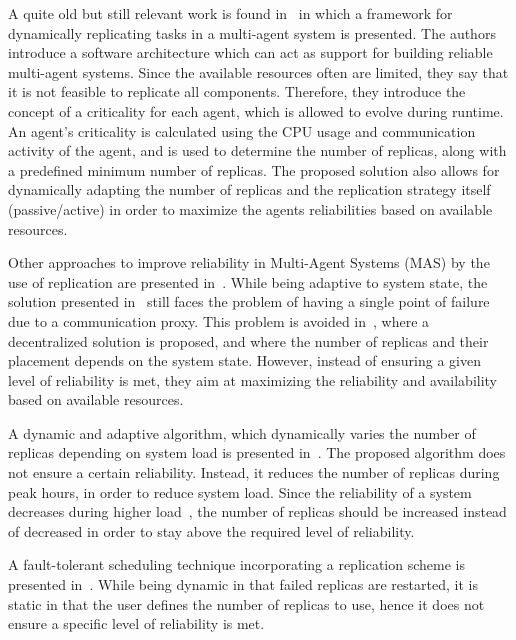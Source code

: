 \documentclass{cslthse-msc}
\begin{document}
A quite old but still relevant work is found in~\cite{dynAdaptRepl} in which a framework for dynamically replicating tasks in a multi-agent system is presented. The authors introduce a software architecture which can act as support for building reliable multi-agent systems. Since the available resources often are limited, they say that it is not feasible to replicate all components. Therefore, they introduce the concept of a criticality for each agent, which is allowed to evolve during runtime. An agent's criticality is calculated using the CPU usage and communication activity of the agent, and is used to determine the number of replicas, along with a predefined minimum number of replicas. The proposed solution also allows for dynamically adapting the number of replicas and the replication strategy itself (passive/active) in order to maximize the agents reliabilities based on available resources. 

Other approaches to improve reliability in Multi-Agent Systems (MAS) by the use of replication are presented in~\cite{replicatingAgents, adaptiveMASReplication, adaptiveAgentReplication}. While being adaptive to system state, the solution presented in~\cite{replicatingAgents} still faces the problem of having a single point of failure due to a communication proxy. This problem is avoided in~\cite{adaptiveMASReplication}, where a decentralized solution is proposed, and where the number of replicas and their placement depends on the system state. However, instead of ensuring a given level of reliability is met, they aim at maximizing the reliability and availability based on available resources.

A dynamic and adaptive algorithm, which dynamically varies the number of replicas depending on system load is presented in~\cite{adaptiveCheckPointAndRep}. The proposed algorithm does not ensure a certain reliability. Instead, it reduces the number of replicas during peak hours, in order to reduce system load. Since the reliability of a system decreases during higher load~\cite{studyOfFailures, implicationsOfFailures}, the number of replicas should be increased instead of decreased in order to stay above the required level of reliability.

A fault-tolerant scheduling technique incorporating a replication scheme is presented in~\cite{faultTolerantSchedPolicy}. While being dynamic in that failed replicas are restarted, it is static in that the user defines the number of replicas to use, hence it does not ensure a specific level of reliability is met.
\end{document}
